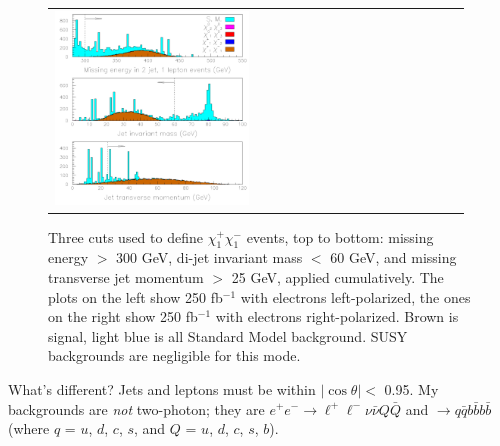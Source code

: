 \documentclass[landscape]{article}
\begin{document}
\begin{figure}[!ht]
\begin{center}
\begin{tabular}{p{0.49\linewidth} p{0.49\linewidth}}
      \begin{minipage}{\linewidth} \includegraphics[width=\linewidth]{charginos_right.pdf} \end{minipage}
    \end{tabular}

    \caption{\large Three cuts used to define $\chi_1^+\chi_1^-$ events, top
    to bottom: missing energy $>$ 300 GeV, di-jet invariant mass $<$
    60 GeV, and missing transverse jet momentum $>$ 25 GeV, applied
    cumulatively.  The plots on the left show 250 fb$^{-1}$ with
    electrons left-polarized, the ones on the right show 250 fb$^{-1}$
    with electrons right-polarized.  Brown is signal, light blue is
    all Standard Model background.  SUSY backgrounds are negligible
    for this mode.}

    \label{jimpcharginocuts}
  \end{center}
\end{figure}

What's different?  Jets and leptons must be within $|\cos\theta| <$
0.95.  My backgrounds are {\it not} two-photon; they are $e^+e^- \to
\ell^+\ell^- \nu \bar{\nu} Q \bar{Q}$ and $\to q \bar{q} b \bar{b} b
\bar{b}$ (where $q$ = $u$, $d$, $c$, $s$, and $Q$ = $u$, $d$, $c$,
$s$, $b$).

\pagebreak
\end{document}
